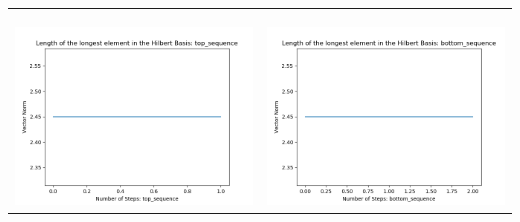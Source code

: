\documentclass[10pt]{article}
\begin{document}
\begin{tabular}{c|c}
\begin{minipage}{.45\textwidth}
\end{minipage} \\ \\
\hline \\\begin{minipage}{.45\textwidth}
\includegraphics[width=\textwidth]{"DATA/5d/5 generators 1 bound A/top_sequence LENGTH"}
\end{minipage} &
\begin{minipage}{.45\textwidth}
\includegraphics[width=\textwidth]{"DATA/5d/5 generators 1 bound A bottomup/bottom_sequence LENGTH"}
\end{minipage}
\end{tabular}
\end{document}
